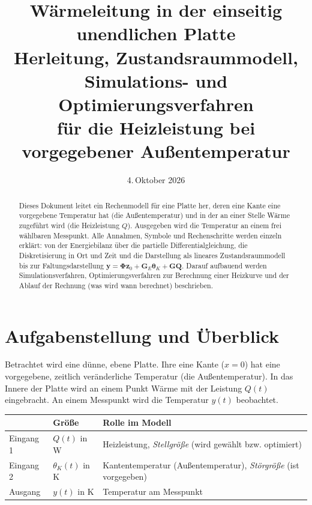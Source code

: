 \documentclass[11pt,a4paper]{article}
\title{\textbf{Wärmeleitung in der einseitig unendlichen Platte}\\[0.4em]
\large Herleitung, Zustandsraummodell, Simulations- und Optimierungsverfahren\\ für die Heizleistung bei vorgegebener Außentemperatur}
\author{}
\date{4.\,Oktober 2026}
\numberwithin{equation}{section}
\newcommand{\thK}{\theta_{K}}
\newcommand{\vthK}{\symbf{\theta}_{K}}
\newcommand{\mG}{\mathbf{G}}
\newcommand{\mGE}{\mathbf{G}_{E}}
\newcommand{\mPhi}{\symbf{\Phi}}
\newcommand{\vz}{\mathbf{z}}
\newcommand{\vy}{\mathbf{y}}
\newcommand{\vQ}{\mathbf{Q}}
\begin{document}
\maketitle
\thispagestyle{fancy}

\renewcommand{\abstractname}{Zusammenfassung}
\begin{abstract}
\noindent
Dieses Dokument leitet ein Rechenmodell für eine Platte her, deren eine Kante eine vorgegebene Temperatur hat (die Außentemperatur) und in der an einer Stelle Wärme zugeführt wird (die Heizleistung $Q$). Ausgegeben wird die Temperatur an einem frei wählbaren Messpunkt. Alle Annahmen, Symbole und Rechenschritte werden einzeln erklärt: von der Energiebilanz über die partielle Differentialgleichung, die Diskretisierung in Ort und Zeit und die Darstellung als lineares Zustandsraummodell bis zur Faltungsdarstellung $\vy = \mPhi\vz_0 + \mGE\vthK + \mG\vQ$. Darauf aufbauend werden Simulationsverfahren, Optimierungsverfahren zur Berechnung einer Heizkurve und der Ablauf der Rechnung (was wird wann berechnet) beschrieben.
\end{abstract}

\tableofcontents
\newpage

\section{Aufgabenstellung und Überblick}

Betrachtet wird eine dünne, ebene Platte. Ihre eine Kante ($x=0$) hat eine vorgegebene, zeitlich veränderliche Temperatur (die Außentemperatur). In das Innere der Platte wird an einem Punkt Wärme mit der Leistung $Q(t)$ eingebracht. An einem Messpunkt wird die Temperatur $y(t)$ beobachtet.

\begin{center}
\begin{tabular}{lll}
\toprule
 & Größe & Rolle im Modell \\
\midrule
Eingang 1 & $Q(t)$ in W & Heizleistung, \emph{Stellgröße} (wird gewählt bzw. optimiert) \\
Eingang 2 & $\thK(t)$ in K & Kantentemperatur (Außentemperatur), \emph{Störgröße} (ist vorgegeben) \\
Ausgang & $y(t)$ in K & Temperatur am Messpunkt \\
\bottomrule
\end{tabular}
\end{center}
\end{document}
